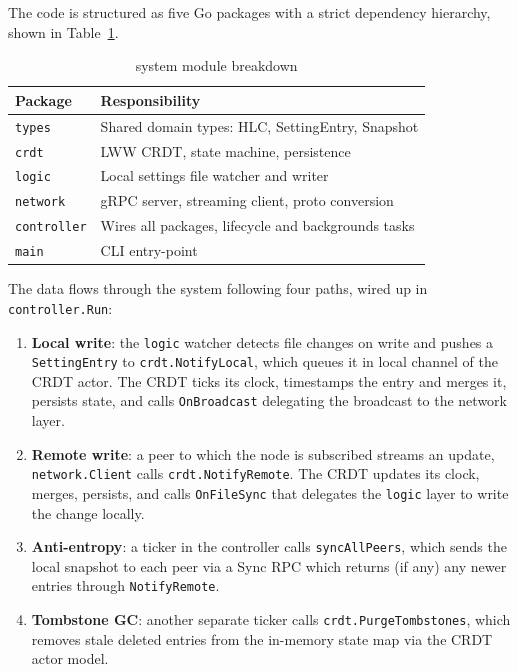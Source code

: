 \documentclass[conference]{IEEEtran}
\begin{document}
The code is structured as five Go packages with a strict dependency
hierarchy, shown in Table~\ref{tab:packages}.

\begin{table}[htbp]
  \caption{system module breakdown}
  \label{tab:packages}
  \begin{center}
    \begin{tabular}{ll}
      \toprule
      \textbf{Package} & \textbf{Responsibility} \\
      \midrule
      \texttt{types}      & Shared domain types: HLC, SettingEntry, Snapshot \\
      \texttt{crdt}       & LWW CRDT, state machine, persistence \\
      \texttt{logic}      & Local settings file watcher and writer \\
      \texttt{network}    & gRPC server, streaming client, proto conversion \\
      \texttt{controller} & Wires all packages, lifecycle and backgrounds tasks \\
      \midrule
      \texttt{main}       & CLI entry-point \\
      \bottomrule
    \end{tabular}
  \end{center}
\end{table}

The data flows through the system following four paths, wired up in
\texttt{controller.Run}:

\begin{enumerate}
  \item \textbf{Local write}: the \texttt{logic} watcher detects file
    changes on write and pushes a \texttt{SettingEntry} to \texttt{crdt.NotifyLocal},
    which queues it in local channel of the CRDT actor. The CRDT ticks
    its clock, timestamps the entry and merges it, persists state, and calls
    \texttt{OnBroadcast} delegating the broadcast to the network layer.
  \item \textbf{Remote write}: a peer to which the node is subscribed streams an update,
    \texttt{network.Client} calls \texttt{crdt.NotifyRemote}. The CRDT
    updates its clock, merges, persists, and calls \texttt{OnFileSync}
    that delegates the \texttt{logic} layer to write the change locally.
  \item \textbf{Anti-entropy}: a ticker in the controller calls \texttt{syncAllPeers},
    which sends the local snapshot to each peer via a Sync RPC which returns (if any)
    any newer entries through \texttt{NotifyRemote}.
  \item \textbf{Tombstone GC}: another separate ticker calls
    \texttt{crdt.PurgeTombstones}, which removes stale deleted entries
    from the in-memory state map via the CRDT actor model.
\end{enumerate}
\end{document}
